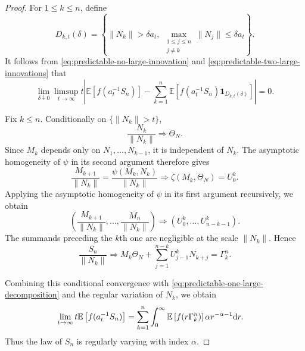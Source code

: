 \documentclass[preprint,12pt]{elsarticle}
\theoremstyle{definition}
\theoremstyle{remark}
\newcommand{\Mbf}{{ M}}
\newcommand{\Ubf}{{ U}}
\newcommand{\Nbf}{{ N}}
\newcommand{\Sbf}{{ S}}
\newcommand{\1}{{\mathbf 1}}
\numberwithin{equation}{section}
\newcommand{\Ebb}{\mathbb{E}}  %
\newcommand{\ud}{{\rm d}}
\begin{document}
\begin{proof}
    For $1\leq k\leq n$, define
    \begin{equation*}
      D_{k,t}(\delta)
      =
      \left\{
        \|\Nbf_k\|>\delta a_t,\,
        \max_{\substack{1\leq j\leq n\\j\neq k}}
        \|\Nbf_j\|\leq\delta a_t
      \right\}.
    \end{equation*}
    It follows from
    \eqref{eq:predictable-no-large-innovation} and
    \eqref{eq:predictable-two-large-innovations} that
    \begin{equation}\label{eq:predictable-one-large-decomposition}
      \lim_{\delta\downarrow0}
      \limsup_{t\to\infty}
      t\left|
        \Ebb\left[f(a_t^{-1}\Sbf_n)\right]
        -
        \sum_{k=1}^n
        \Ebb\left[
          f(a_t^{-1}\Sbf_n)
          \1_{D_{k,t}(\delta)}
        \right]
      \right|
      =0.
    \end{equation}

    Fix $k\leq n$. Conditionally on $\{\|\Nbf_k\|>t\}$,
    \begin{equation*}
      \frac{\Nbf_k}{\|\Nbf_k\|}
      \Longrightarrow
      \Theta_\Nbf.
    \end{equation*}
    Since $\Mbf_k$ depends only on
    $\Nbf_1,\ldots,\Nbf_{k-1}$, it is independent of $\Nbf_k$.
    The asymptotic homogeneity of $\psi$ in its second argument therefore
    gives
    \begin{equation*}
      \frac{\Mbf_{k+1}}{\|\Nbf_k\|}
      =
      \frac{
        \psi(\Mbf_k,\Nbf_k)
      }{
        \|\Nbf_k\|
      }
      \Longrightarrow
      \zeta(\Mbf_k,\Theta_\Nbf)
      =
      \Ubf_0^k.
    \end{equation*}
    Applying the asymptotic homogeneity of $\psi$ in its first argument
    recursively, we obtain
    \begin{equation*}
      \left(
        \frac{\Mbf_{k+1}}{\|\Nbf_k\|},
        \ldots,
        \frac{\Mbf_n}{\|\Nbf_k\|}
      \right)
      \Longrightarrow
      \left(
        \Ubf_0^k,
        \ldots,
        \Ubf_{n-k-1}^k
      \right).
    \end{equation*}
    The summands preceding the $k$th one are negligible at the scale
    $\|\Nbf_k\|$. Hence
    \begin{equation*}
      \frac{\Sbf_n}{\|\Nbf_k\|}
      \Longrightarrow
      \Mbf_k\Theta_\Nbf
      +
      \sum_{j=1}^{n-k}
      \Ubf_{j-1}^k\Nbf_{k+j}
      =
      \Gamma_k^n.
    \end{equation*}

    Combining this conditional convergence with
    \eqref{eq:predictable-one-large-decomposition} and the regular
    variation of $\Nbf_k$, we obtain
    \begin{align*}\label{eq:predictable-finite-limit}
      \lim_{t\to\infty}
      t\Ebb\left[f(a_t^{-1}\Sbf_n)\right]
      &=
      \sum_{k=1}^n
      \int_0^\infty
      \Ebb\left[
        f(r\Gamma_k^n)
      \right]
      \alpha r^{-\alpha-1}\ud r.
    \end{align*}
    Thus the law of $\Sbf_n$ is regularly varying with index $\alpha$.
  \end{proof}
\end{document}
